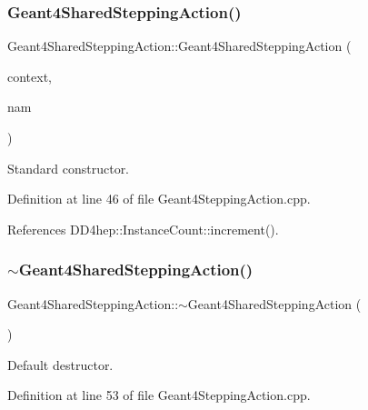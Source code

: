 \subsubsection{\texorpdfstring{Geant4\+Shared\+Stepping\+Action()}{Geant4SharedSteppingAction()}}
{\footnotesize\ttfamily Geant4\+Shared\+Stepping\+Action\+::\+Geant4\+Shared\+Stepping\+Action (\begin{DoxyParamCaption}\item[{\hyperlink{class_d_d4hep_1_1_simulation_1_1_geant4_context}{Geant4\+Context} $\ast$}]{context,  }\item[{const std\+::string \&}]{nam }\end{DoxyParamCaption})}



Standard constructor. 



Definition at line 46 of file Geant4\+Stepping\+Action.\+cpp.



References D\+D4hep\+::\+Instance\+Count\+::increment().

\hypertarget{class_d_d4hep_1_1_simulation_1_1_geant4_shared_stepping_action_a3a2b73cd49e3441d740456240d5125ab}{}\label{class_d_d4hep_1_1_simulation_1_1_geant4_shared_stepping_action_a3a2b73cd49e3441d740456240d5125ab} 
\subsubsection{\texorpdfstring{$\sim$\+Geant4\+Shared\+Stepping\+Action()}{~Geant4SharedSteppingAction()}}
{\footnotesize\ttfamily Geant4\+Shared\+Stepping\+Action\+::$\sim$\+Geant4\+Shared\+Stepping\+Action (\begin{DoxyParamCaption}{ }\end{DoxyParamCaption})\hspace{0.3cm}{\ttfamily [virtual]}}



Default destructor. 



Definition at line 53 of file Geant4\+Stepping\+Action.\+cpp.



